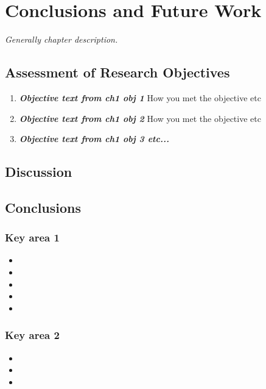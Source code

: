 \chapter{Conclusions and Future Work} \label{Ch:Conc}
\textit{Generally chapter description.}

\section{Assessment of Research Objectives}
\begin{enumerate}
	\item \textbf{\textit{Objective text from ch1 obj 1}} How you met the objective etc 
	
	\item \textbf{\textit{Objective text from ch1 obj 2}} How you met the objective etc 
	
	\item \textbf{\textit{Objective text from ch1 obj 3 etc...}} 
\end{enumerate}


\section{Discussion} \label{Sec:ChNDisc}

\section{Conclusions}

\subsection{Key area 1}
\begin{itemize}
	\item 
	\item 
	\item 
	\item 
	\item 
\end{itemize}

\subsection{Key area 2}
\begin{itemize}
	\item 
	\item 
	\item 
\end{itemize}



